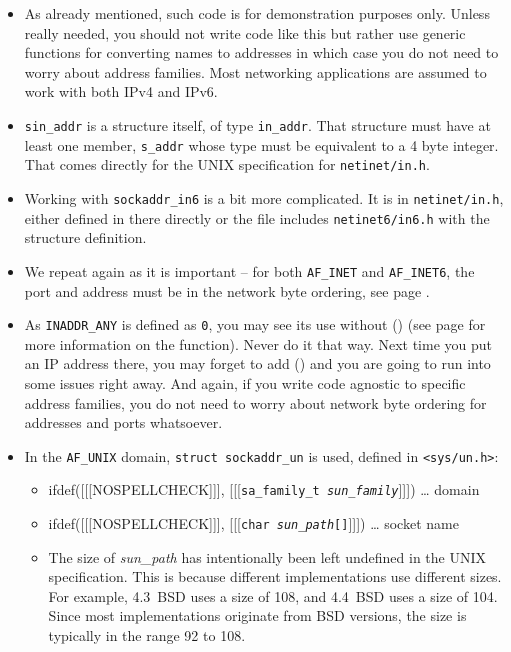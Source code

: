 \begin{itemize}
\item As already mentioned, such code is for demonstration purposes only.
Unless really needed, you should not write code like this but rather use generic
functions for converting names to addresses in which case you do not need to
worry about address families.  Most networking applications are assumed to work
with both IPv4 and IPv6.
\item \texttt{sin\_addr} is a structure itself, of type \texttt{in\_addr}.  That
structure must have at least one member, \texttt{s\_addr} whose type must be
equivalent to a 4 byte integer.  That comes directly for the UNIX specification
for \texttt{netinet/in.h}.
\item Working with \texttt{sockaddr\_in6} is a bit more complicated.  It is in
\texttt{netinet/in.h}, either defined in there directly or the file includes
\texttt{netinet6/in6.h} with the structure definition.
\item We repeat again as it is important -- for both \texttt{AF\_INET} and
\texttt{AF\_INET6}, the port and address must be in the network byte ordering,
see page \pageref{HTON}.
\item As \texttt{INADDR\_ANY} is defined as \texttt{0}, you may see its use
without () (see page \pageref{HTON} for more information on the
function).  Never do it that way.  Next time you put an IP address there, you
may forget to add () and you are going to run into some issues
right away.  And again, if you write code agnostic to specific address families,
you do not need to worry about network byte ordering for addresses and ports
whatsoever.
\item In the \texttt{AF\_UNIX} domain,
\texttt{struct sockaddr\_un} is used, defined in \texttt{<sys/un.h>}:
\begin{itemize}
\item ifdef([[[NOSPELLCHECK]]], [[[\texttt{sa\_family\_t \emph{sun\_family}}]]])
\dots{} domain
\item ifdef([[[NOSPELLCHECK]]], [[[\texttt{char \emph{sun\_path}[]}]]])
\dots{} socket name
\item The size of \emph{sun\_path} has intentionally been left undefined in the
UNIX specification. This is because different implementations use different
sizes.  For example, 4.3~BSD uses a size of 108, and 4.4~BSD uses a size of 104.
Since most implementations originate from BSD versions, the size is typically in
the range 92 to 108.
\end{itemize}
\end{itemize}

